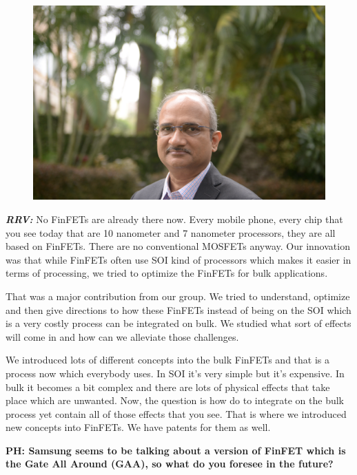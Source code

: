\begin{multicols}{2}
\setcounter{figure}{0}
\begin{figure}[H]
\centering
\includegraphics[scale=.5]{src/Figures/interview/interview-fig06.jpg}
\vspace{-.7cm}
\end{figure}

\textbf{\textit{RRV:}} No FinFETs are already there now. Every mobile phone, every chip that you see today that are 10 nanometer and 7 nanometer processors, they are all based on FinFETs. There are no conventional MOSFETs anyway. Our innovation was that while FinFETs often use SOI kind of processors which makes it easier in terms of processing, we tried to optimize the FinFETs for bulk applications.

That was a major contribution from our group. We tried to understand, optimize and then give directions to how these FinFETs instead of being on the SOI which is a very costly process can be integrated on bulk. We studied what sort of effects will come in and how can we alleviate those challenges.

We introduced lots of different concepts into the bulk FinFETs and that is a process now which everybody uses. In SOI it’s very simple but it’s expensive. In bulk it becomes a bit complex and there are lots of physical effects that take place which are unwanted. Now, the question is how do to integrate on the bulk process yet contain all of those effects that you see. That is where we introduced new concepts into FinFETs. We have patents for them as well.

\textbf{PH: Samsung seems to be talking about a version of FinFET which is the Gate All Around (GAA), so what do you foresee in the future?}


\end{multicols}
